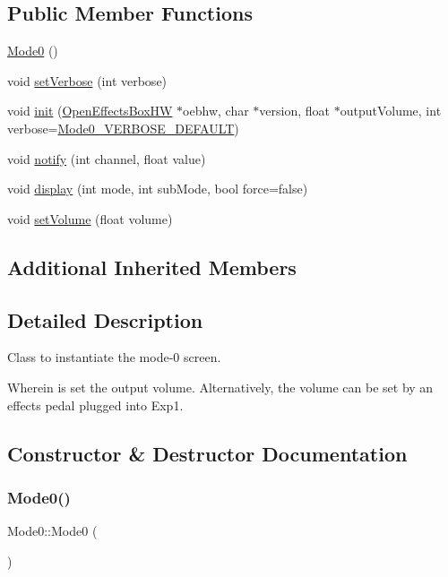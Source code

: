 \subsection*{Public Member Functions}
\begin{DoxyCompactItemize}
\item 
\mbox{\hyperlink{class_mode0_a176e35d58a2f2230fc635bf150a1d35d}{Mode0}} ()
\item 
void \mbox{\hyperlink{class_mode0_af3ee35f532b8110005163207671ece18}{set\+Verbose}} (int verbose)
\item 
void \mbox{\hyperlink{class_mode0_a21802f200c6e3792ca5f8daf91ce910c}{init}} (\mbox{\hyperlink{class_open_effects_box_h_w}{Open\+Effects\+Box\+HW}} $\ast$oebhw, char $\ast$version, float $\ast$output\+Volume, int verbose=\mbox{\hyperlink{_mode0_8h_a1851011771f1e9b90e1ea5dada4cd724}{Mode0\+\_\+\+V\+E\+R\+B\+O\+S\+E\+\_\+\+D\+E\+F\+A\+U\+LT}})
\item 
void \mbox{\hyperlink{class_mode0_a743ebe3d0faccc421d06c9114026a099}{notify}} (int channel, float value)
\item 
void \mbox{\hyperlink{class_mode0_a7d43e749cfd1831974f36d7d8e54e221}{display}} (int mode, int sub\+Mode, bool force=false)
\item 
void \mbox{\hyperlink{class_mode0_ae7c9f24425bf7947b56d9061b353393c}{set\+Volume}} (float volume)
\end{DoxyCompactItemize}
\subsection*{Additional Inherited Members}


\subsection{Detailed Description}
Class to instantiate the mode-\/0 screen. 

Wherein is set the output volume. Alternatively, the volume can be set by an effects pedal plugged into Exp1. 

\subsection{Constructor \& Destructor Documentation}
\mbox{\label{class_mode0_a176e35d58a2f2230fc635bf150a1d35d}} 
\subsubsection{\texorpdfstring{Mode0()}{Mode0()}}
{\footnotesize\ttfamily Mode0\+::\+Mode0 (\begin{DoxyParamCaption}{ }\end{DoxyParamCaption})}



